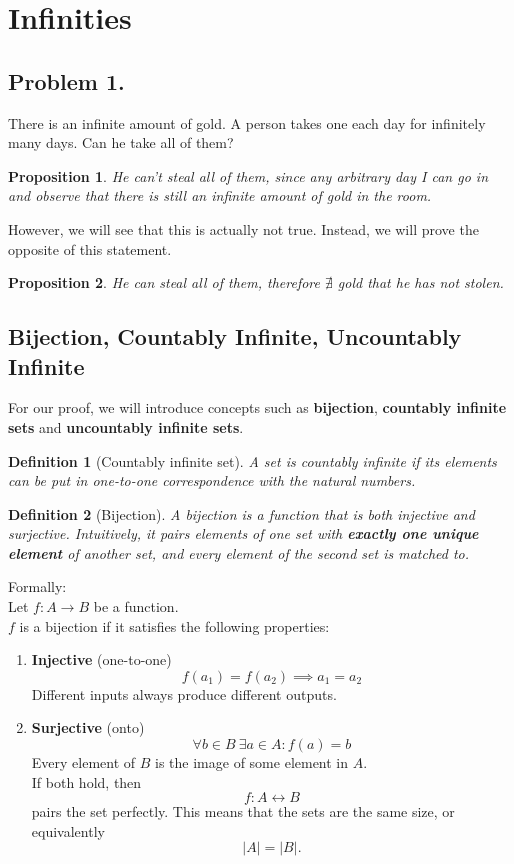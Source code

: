 \documentclass{article}
\newtheorem{proposition}{Proposition}
\newtheorem{definition}{Definition}
\begin{document}
\section{Infinities}
\subsection{Problem 1.}
There is an infinite amount of gold. A person takes one each day for infinitely many days. Can he take all of them?

\begin{proposition}
  He can't steal all of them, since any arbitrary day I can go in and observe that there is still an infinite amount of gold in the room.
\end{proposition}
However, we will see that this is actually not true. Instead, we will prove the opposite of this statement.
\begin{proposition}
    He can steal all of them, therefore $\nexists$ gold that he has not stolen.
\end{proposition}

\subsection{Bijection, Countably Infinite, Uncountably Infinite}

For our proof, we will introduce concepts such as \textbf{bijection}, \textbf{countably infinite sets} and \textbf{uncountably infinite sets}.
\begin{definition}[Countably infinite set]
    A set is countably infinite if its elements can be put in one-to-one correspondence with the natural numbers.
\end{definition}

\begin{definition}[Bijection]
    A bijection is a function that is both injective and surjective. Intuitively, it pairs elements of one set with \textbf{exactly one unique element} of another set, and every element of the second set is matched to.
\end{definition}
    Formally:\\
    Let $f : A \rightarrow B$ be a function.\\
    $f$ is a bijection if it satisfies the following properties:
    \begin{enumerate}
        \item \textbf{Injective} (one-to-one)
        \[
            f(a_1) = f(a_2) \implies a_1 = a_2
        \]
        Different inputs always produce different outputs.
        \item \textbf{Surjective} (onto)
        \[
            \forall b \in B \: \exists a \in A : f(a) = b
        \]
        Every element of $B$ is the image of some element in $A$.\\
        If both hold, then
        \[
        f : A \leftrightarrow B
        \]
        pairs the set perfectly. This means that the sets are the same size, or equivalently
        \[
        |A| = |B|.
        \]
    \end{enumerate}
\end{document}

